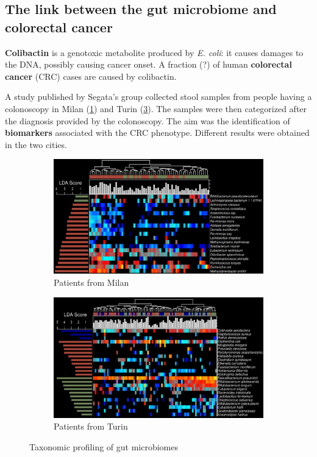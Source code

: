 \subsection{The link between the gut microbiome and colorectal cancer}

\textbf{Colibactin} is a genotoxic metabolite produced by \emph{E. coli}: it causes damages to the DNA, possibly causing cancer onset. A fraction (?) of human \textbf{colorectal cancer} (CRC) cases are caused by colibactin. 

A study published by Segata’s group collected stool samples from people having a colonoscopy in Milan (\ref{fig:milanCRC}) and Turin (\ref{fig:turinCRC}). The samples were then categorized after the diagnosis provided by the colonoscopy. The aim was the identification of \textbf{biomarkers} associated with the CRC phenotype. Different results were obtained in the two cities. \\

\begin{figure}[!h]
\centering
\begin{subfigure}{.45\textwidth}
    \centering
    \includegraphics[width=\linewidth]{MilanCRC.png}
    \caption{\label{fig:milanCRC}Patients from Milan}
\end{subfigure}
%
\begin{subfigure}{.45\textwidth}
    \centering
    \includegraphics[width=\linewidth]{TurinCRC.png}
    \caption{\label{fig:turinCRC}Patients from Turin}
\end{subfigure}
\caption{Taxonomic profiling of gut microbiomes}
\end{figure}

